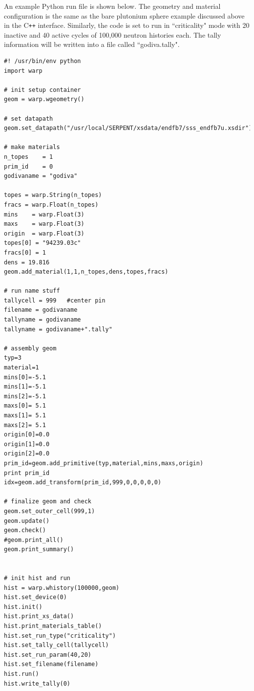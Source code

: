 \documentclass[twoside,a4paper]{refart}
\begin{document}
An example Python run file is shown below. The geometry and material configuration is the same as the
bare plutonium sphere example discussed above in the C\texttt{++} interface. Similarly, the code is set
to run in ``criticality" mode with 20 inactive and 40 active cycles of 100,000 neutron histories each.
The tally information will be written into a file called ``godiva.tally".

\begin{verbatim}
#! /usr/bin/env python
import warp

# init setup container
geom = warp.wgeometry()

# set datapath
geom.set_datapath("/usr/local/SERPENT/xsdata/endfb7/sss_endfb7u.xsdir")

# make materials
n_topes    = 1
prim_id    = 0
godivaname = "godiva"

topes = warp.String(n_topes)
fracs = warp.Float(n_topes)
mins    = warp.Float(3)
maxs    = warp.Float(3)
origin  = warp.Float(3)
topes[0] = "94239.03c"
fracs[0] = 1
dens = 19.816
geom.add_material(1,1,n_topes,dens,topes,fracs)

# run name stuff
tallycell = 999   #center pin
filename = godivaname
tallyname = godivaname
tallyname = godivaname+".tally"

# assembly geom
typ=3
material=1
mins[0]=-5.1
mins[1]=-5.1
mins[2]=-5.1
maxs[0]= 5.1
maxs[1]= 5.1
maxs[2]= 5.1
origin[0]=0.0
origin[1]=0.0
origin[2]=0.0
prim_id=geom.add_primitive(typ,material,mins,maxs,origin)
print prim_id
idx=geom.add_transform(prim_id,999,0,0,0,0,0)

# finalize geom and check
geom.set_outer_cell(999,1)
geom.update()
geom.check()
#geom.print_all()
geom.print_summary()


# init hist and run
hist = warp.whistory(100000,geom)
hist.set_device(0)
hist.init()
hist.print_xs_data()
hist.print_materials_table()
hist.set_run_type("criticality")
hist.set_tally_cell(tallycell)
hist.set_run_param(40,20)
hist.set_filename(filename)
hist.run()
hist.write_tally(0)
\end{verbatim}

\printindex
\end{document}

